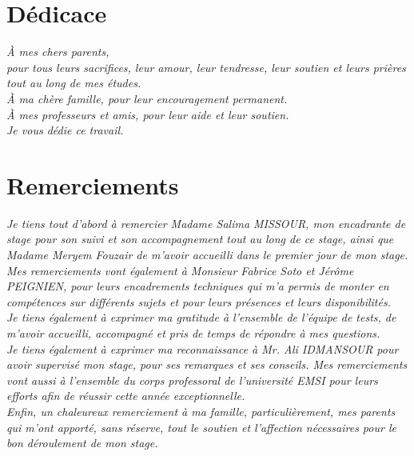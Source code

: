 

\newpage
\chapter*{Dédicace}

\begin{center}
\fontsize{16}{19}\itshape\selectfont
À mes chers parents,\\
pour tous leurs sacrifices, leur amour, leur tendresse, leur soutien et leurs prières tout au long de mes études.\\
À ma chère famille, pour leur encouragement permanent.\\
À mes professeurs et amis, pour leur aide et leur soutien.\\
Je vous dédie ce travail.
\end{center}

\newpage
\chapter*{Remerciements}

\begin{center}
\fontsize{16}{19}\itshape\selectfont
Je tiens tout d'abord à remercier Madame Salima MISSOUR, mon encadrante de stage pour son suivi et son accompagnement tout au long de ce stage, ainsi que Madame Meryem Fouzair de m'avoir accueilli dans le premier jour de mon stage.\\[10pt]

Mes remerciements vont également à Monsieur Fabrice Soto et Jérôme PEIGNIEN, pour leurs encadrements techniques qui m'a permis de monter en compétences sur différents sujets et pour leurs présences et leurs disponibilités.\\[10pt]

Je tiens également à exprimer ma gratitude à l'ensemble de l'équipe de tests, de m'avoir accueilli, accompagné et pris de temps de répondre à mes questions.\\[10pt]

Je tiens également à exprimer ma reconnaissance à Mr. Ali IDMANSOUR pour avoir supervisé mon stage, pour ses remarques et ses conseils. Mes remerciements vont aussi à l'ensemble du corps professoral de l'université EMSI pour leurs efforts afin de réussir cette année exceptionnelle.\\[10pt]

Enfin, un chaleureux remerciement à ma famille, particulièrement, mes parents qui m'ont apporté, sans réserve, tout le soutien et l'affection nécessaires pour le bon déroulement de mon stage.
\end{center}

